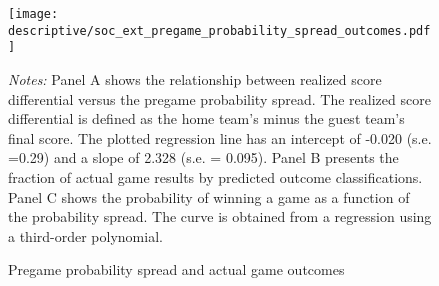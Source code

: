 \vspace*{\fill}\clearpage
\vspace*{\fill}
\begin{figure}[H]\centering
	\texttt{[image: descriptive/soc\_ext\_pregame\_probability\_spread\_outcomes.pdf]}
	\scriptsize
	\begin{minipage}{\linewidth}
		\caption{Pregame probability spread and actual game outcomes}\label{fig_soc_ext:pregame_probability_spread_outcomes}
		\emph{Notes:} Panel A shows the relationship between realized score differential versus the pregame probability spread. The realized score differential is defined as the home team's minus the guest team's final score. The plotted regression line has an intercept of -0.020 (s.e. =0.29) and a slope of 2.328 (s.e. = 0.095). Panel B presents the fraction of actual game results by predicted outcome classifications. Panel C shows the probability of winning a game as a function of the probability spread. The curve is obtained from a regression using a third-order polynomial.
	\end{minipage}
\end{figure}
\vspace*{\fill}\clearpage



